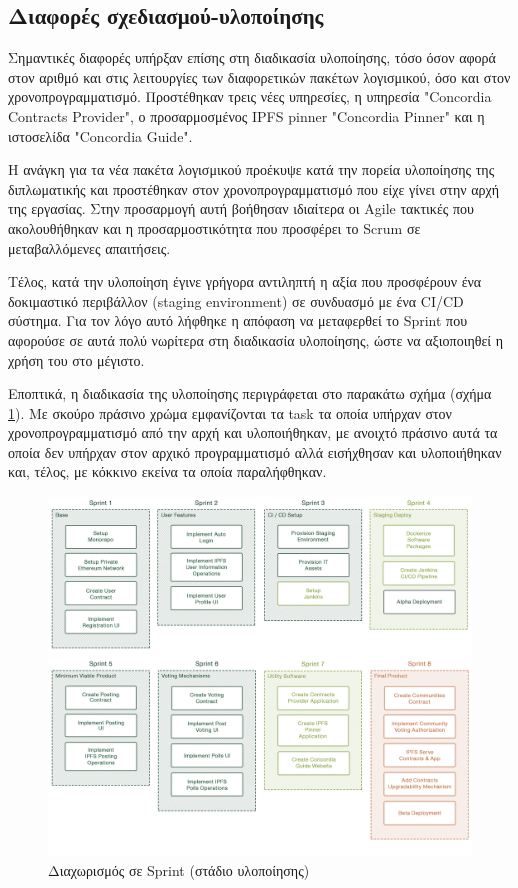 \subsection{Διαφορές σχεδιασμού-υλοποίησης} \label{subsection:4-5-1-design-implementation-differences}

Σημαντικές διαφορές υπήρξαν επίσης στη διαδικασία υλοποίησης, τόσο όσον αφορά στον αριθμό και στις λειτουργίες των διαφορετικών πακέτων λογισμικού, όσο και στον χρονοπρογραμματισμό. Προστέθηκαν τρεις νέες υπηρεσίες, η υπηρεσία "Concordia Contracts Provider", ο προσαρμοσμένος IPFS pinner "Concordia Pinner" και η ιστοσελίδα "Concordia Guide".

Η ανάγκη για τα νέα πακέτα λογισμικού προέκυψε κατά την πορεία υλοποίησης της διπλωματικής και προστέθηκαν στον χρονοπρογραμματισμό που είχε γίνει στην αρχή της εργασίας. Στην προσαρμογή αυτή βοήθησαν ιδιαίτερα οι Agile τακτικές που ακολουθήθηκαν και η προσαρμοστικότητα που προσφέρει το Scrum σε μεταβαλλόμενες απαιτήσεις.

Τέλος, κατά την υλοποίηση έγινε γρήγορα αντιληπτή η αξία που προσφέρουν ένα δοκιμαστικό περιβάλλον (staging environment) σε συνδυασμό με ένα CI/CD σύστημα. Για τον λόγο αυτό λήφθηκε η απόφαση να μεταφερθεί το Sprint που αφορούσε σε αυτά πολύ νωρίτερα στη διαδικασία υλοποίησης, ώστε να αξιοποιηθεί η χρήση του στο μέγιστο.

\newpage
Εποπτικά, η διαδικασία της υλοποίησης περιγράφεται στο παρακάτω σχήμα (σχήμα \ref{figure:4.5.design-implementation-differences-sprints}). Με σκούρο πράσινο χρώμα εμφανίζονται τα task τα οποία υπήρχαν στον χρονοπρογραμματισμό από την αρχή και υλοποιήθηκαν, με ανοιχτό πράσινο αυτά τα οποία δεν υπήρχαν στον αρχικό προγραμματισμό αλλά εισήχθησαν και υλοποιήθηκαν και, τέλος, με κόκκινο εκείνα τα οποία παραλήφθηκαν.

\vspace{\baselineskip}

\begin{figure}[H]
    \centering
    \includegraphics[width=\textwidth]{assets/figures/chapter-4/4.6.design-implementation-differences-sprints.png}
    \caption{Διαχωρισμός σε Sprint (στάδιο υλοποίησης)}
    \label{figure:4.5.design-implementation-differences-sprints}
\end{figure}
